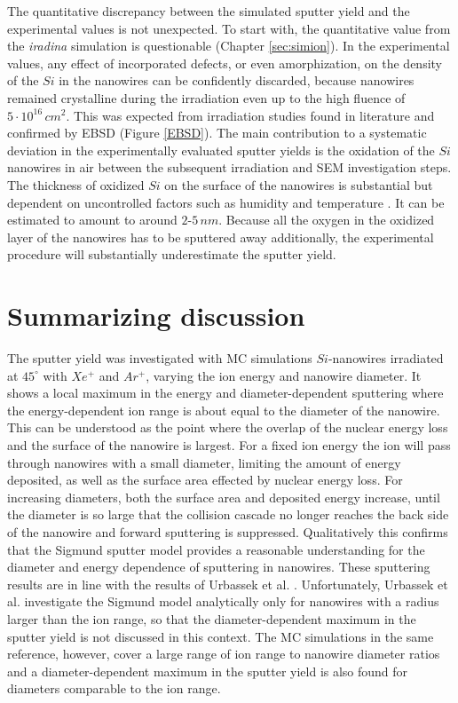 The quantitative discrepancy between the simulated sputter yield and the experimental values is not unexpected. To start with, the quantitative value from the \emph{iradina} simulation is questionable (Chapter \ref{sec:simion}). In the experimental values, any effect of incorporated defects, or even amorphization, on the density of the $Si$ in the nanowires can be confidently discarded, because nanowires remained crystalline during the irradiation even up to the high fluence of $5\cdot 10^{16}\,cm^2$. This was expected from irradiation studies found in literature \cite{pelaz_ion-beam-induced_2004} and confirmed by EBSD (Figure \ref{EBSD}). The main contribution to a systematic deviation in the experimentally evaluated sputter yields is the oxidation of the $Si$ nanowires in air between the subsequent irradiation and SEM investigation steps. The thickness of oxidized $Si$ on the surface of the nanowires is substantial but dependent on uncontrolled factors such as humidity and temperature \cite{lukes_oxidation_1972,al-bayati_composition_1991}. It can be estimated to amount to around $2$-$5\,nm$. Because all the oxygen in the oxidized layer of the nanowires has to be sputtered away additionally, the experimental procedure will substantially underestimate the sputter yield.


\section{Summarizing discussion}

The sputter yield was investigated with MC simulations $Si$-nanowires irradiated at $45^\circ$ with $Xe^+$ and $Ar^+$, varying the ion energy and nanowire diameter. It shows a local maximum in the energy and diameter-dependent sputtering where the energy-dependent ion range is about equal to the diameter of the nanowire. This can be understood as the point where the overlap of the nuclear energy loss and the surface of the nanowire is largest. For a fixed ion energy the ion will pass through nanowires with a small diameter, limiting the amount of energy deposited, as well as the surface area effected by nuclear energy loss. For increasing diameters, both the surface area and deposited energy increase, until the diameter is so large that the collision cascade no longer reaches the back side of the nanowire and forward sputtering is suppressed. Qualitatively this confirms that the Sigmund sputter model provides a reasonable understanding for the diameter and energy dependence of sputtering in nanowires. These sputtering results are in line with the results of Urbassek et al. \cite{urbassek_sputter_2015}. Unfortunately, Urbassek et al. investigate the Sigmund model analytically only for nanowires with a radius larger than the ion range, so that the diameter-dependent maximum in the sputter yield is not discussed in this context. The MC simulations in the same reference, however, cover a large range of ion range to nanowire diameter ratios and a diameter-dependent maximum in the sputter yield is also found for diameters comparable to the ion range. 
 

